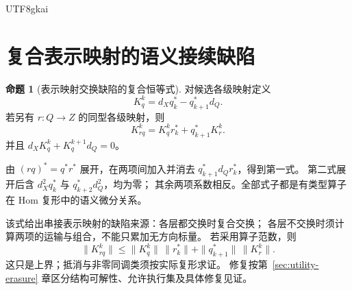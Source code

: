 \documentclass[12pt]{report}
\makeatletter
\theoremstyle{definition}
\newtheorem{proposition}{命题}[chapter]
\renewenvironment{proof}[1][\proofname]{\par
  \pushQED{\qed}\normalfont
  \topsep6\p@\@plus6\p@\relax
  \trivlist
  \item[\hskip\labelsep\normalfont #1\@addpunct{.}]\ignorespaces
}{
  \popQED\endtrivlist\@endpefalse
}
\makeatother
\begin{document}
\begin{CJK*}{UTF8}{gkai}
\section{复合表示映射的语义接续缺陷}
\begin{proposition}[表示映射交换缺陷的复合恒等式]
\label{prop:map-defect}
对候选各级映射定义
\[
K_q^k=d_Xq_k^*-q_{k+1}^*d_Q.
\]
若另有 \(r:Q\to Z\) 的同型各级映射，则
\[
K_{rq}^k=K_q^kr_k^*+q_{k+1}^*K_r^k.
\]
并且 \(d_XK_q^k+K_q^{k+1}d_Q=0\)。
\end{proposition}
\begin{proof}
由 \((rq)^*=q^*r^*\) 展开，在两项间加入并消去
\(q_{k+1}^*d_Qr_k^*\)，得到第一式。
第二式展开后含 \(d_X^2q_k^*\) 与 \(q_{k+2}^*d_Q^2\)，均为零；
其余两项系数相反。全部式子都是有类型算子在 Hom 复形中的语义微分关系。
\end{proof}
该式给出串接表示映射的缺陷来源：各层都交换时复合交换；
各层不交换时须计算两项的运输与组合，不能只累加无方向标量。
若采用算子范数，则
\[
\|K_{rq}^k\|\le \|K_q^k\|\,\|r_k^*\|
+\|q_{k+1}^*\|\,\|K_r^k\|.
\]
这只是上界；抵消与非零同调类须按实际复形求证。
修复按第~\ref{sec:utility-erasure} 章区分结构可解性、允许执行集及具体修复见证。


\end{CJK*}
\end{document}
